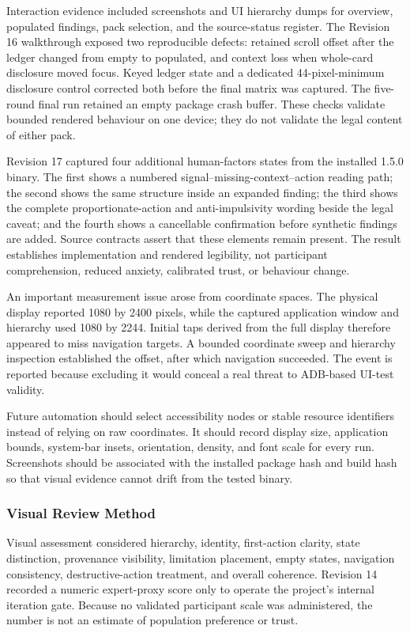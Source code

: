 Interaction evidence included screenshots and UI hierarchy dumps for overview, populated findings, pack selection, and the source-status register. The Revision 16 walkthrough exposed two reproducible defects: retained scroll offset after the ledger changed from empty to populated, and context loss when whole-card disclosure moved focus. Keyed ledger state and a dedicated 44-pixel-minimum disclosure control corrected both before the final matrix was captured. The five-round final run retained an empty package crash buffer. These checks validate bounded rendered behaviour on one device; they do not validate the legal content of either pack.

Revision 17 captured four additional human-factors states from the installed 1.5.0 binary. The first shows a numbered signal--missing-context--action reading path; the second shows the same structure inside an expanded finding; the third shows the complete proportionate-action and anti-impulsivity wording beside the legal caveat; and the fourth shows a cancellable confirmation before synthetic findings are added. Source contracts assert that these elements remain present. The result establishes implementation and rendered legibility, not participant comprehension, reduced anxiety, calibrated trust, or behaviour change.

An important measurement issue arose from coordinate spaces. The physical display reported 1080 by 2400 pixels, while the captured application window and hierarchy used 1080 by 2244. Initial taps derived from the full display therefore appeared to miss navigation targets. A bounded coordinate sweep and hierarchy inspection established the offset, after which navigation succeeded. The event is reported because excluding it would conceal a real threat to ADB-based UI-test validity.

Future automation should select accessibility nodes or stable resource identifiers instead of relying on raw coordinates. It should record display size, application bounds, system-bar insets, orientation, density, and font scale for every run. Screenshots should be associated with the installed package hash and build hash so that visual evidence cannot drift from the tested binary.

\subsubsection{Visual Review Method}

Visual assessment considered hierarchy, identity, first-action clarity, state distinction, provenance visibility, limitation placement, empty states, navigation consistency, destructive-action treatment, and overall coherence. Revision 14 recorded a numeric expert-proxy score only to operate the project's internal iteration gate. Because no validated participant scale was administered, the number is not an estimate of population preference or trust.

